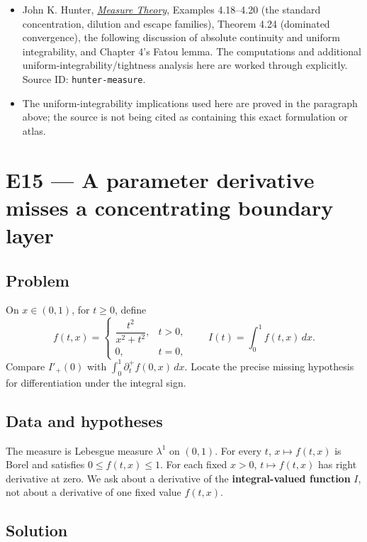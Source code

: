\documentclass[
  11pt,
]{article}
\providecommand{\tightlist}{%
  \setlength{\itemsep}{0pt}\setlength{\parskip}{0pt}}
\begin{document}
\begin{itemize}
\tightlist
\item
  John K. Hunter,
  \href{https://www.math.ucdavis.edu/~hunter/measure_theory/measure_notes.pdf}{\emph{Measure
  Theory}}, Examples 4.18--4.20 (the standard concentration, dilution
  and escape families), Theorem 4.24 (dominated convergence), the
  following discussion of absolute continuity and uniform integrability,
  and Chapter 4's Fatou lemma. The computations and additional
  uniform-integrability/tightness analysis here are worked through
  explicitly. Source ID: \texttt{hunter-\allowbreak{}measure}.
\item
  The uniform-integrability implications used here are proved in the
  paragraph above; the source is not being cited as containing this
  exact formulation or atlas.
\end{itemize}

\section{E15 --- A parameter derivative misses a concentrating boundary
layer}\label{E15}

\subsection{Problem}\label{problem-14}

On \(x\in(0,1)\), for \(t\ge0\), define \[
f(t,x)=\begin{cases}\dfrac{t^2}{x^2+t^2},&t>0,\\0,&t=0,\end{cases}
\qquad I(t)=\int_0^1f(t,x)\,dx.
\] Compare \(I'_+(0)\) with \(\int_0^1\partial_t^+f(0,x)\,dx\). Locate
the precise missing hypothesis for differentiation under the integral
sign.

\subsection{Data and hypotheses}\label{data-and-hypotheses-14}

The measure is Lebesgue measure \(\lambda^1\) on \((0,1)\). For every
\(t\), \(x\mapsto f(t,x)\) is Borel and satisfies \(0\le f(t,x)\le1\).
For each fixed \(x>0\), \(t\mapsto f(t,x)\) has right derivative at
zero. We ask about a derivative of the \textbf{integral-valued function}
\(I\), not about a derivative of one fixed value \(f(t,x)\).

\subsection{Solution}\label{solution-14}
\end{document}
